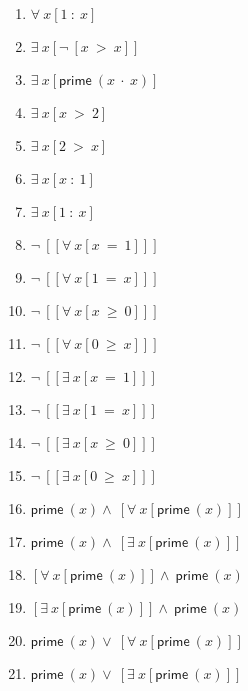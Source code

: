 \documentclass{article}
\begin{document}
\begin{enumerate}
\item $\forall \ x[1 \ : \ x]$

\item $\exists \ x[\neg \ [x \ > \ x]]$

\item $\exists \ x[\mathsf{prime} \ (x \ \cdot \ x)]$

\item $\exists \ x[x \ > \ 2]$

\item $\exists \ x[2 \ > \ x]$

\item $\exists \ x[x \ : \ 1]$

\item $\exists \ x[1 \ : \ x]$

\item $\neg \ [[\forall \ x[x \ = \ 1]]]$

\item $\neg \ [[\forall \ x[1 \ = \ x]]]$

\item $\neg \ [[\forall \ x[x \ \ge \ 0]]]$

\item $\neg \ [[\forall \ x[0 \ \ge \ x]]]$

\item $\neg \ [[\exists \ x[x \ = \ 1]]]$

\item $\neg \ [[\exists \ x[1 \ = \ x]]]$

\item $\neg \ [[\exists \ x[x \ \ge \ 0]]]$

\item $\neg \ [[\exists \ x[0 \ \ge \ x]]]$

\item $\mathsf{prime} \ (x)\wedge \ [\forall \ x[\mathsf{prime} \ (x)]]$

\item $\mathsf{prime} \ (x)\wedge \ [\exists \ x[\mathsf{prime} \ (x)]]$

\item $[\forall \ x[\mathsf{prime} \ (x)]]\wedge \ \mathsf{prime} \ (x)$

\item $[\exists \ x[\mathsf{prime} \ (x)]]\wedge \ \mathsf{prime} \ (x)$

\item $\mathsf{prime} \ (x)\lor \ [\forall \ x[\mathsf{prime} \ (x)]]$

\item $\mathsf{prime} \ (x)\lor \ [\exists \ x[\mathsf{prime} \ (x)]]$


\end{enumerate}
\end{document}
